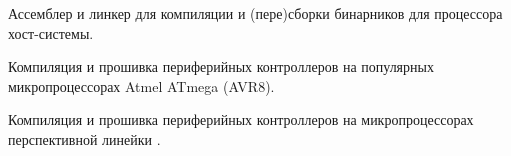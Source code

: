 

Ассемблер и линкер для компиляции и (пере)сборки бинарников для процессора
хост-системы.


Компиляция и прошивка периферийных контроллеров на популярных микропроцессорах
Atmel ATmega (AVR8).


Компиляция и прошивка периферийных контроллеров на микропроцессорах
перспективной линейки \cmx.



\label{azpython}

\label{azgcl}

\label{azmaxima}

\secup

\secup
